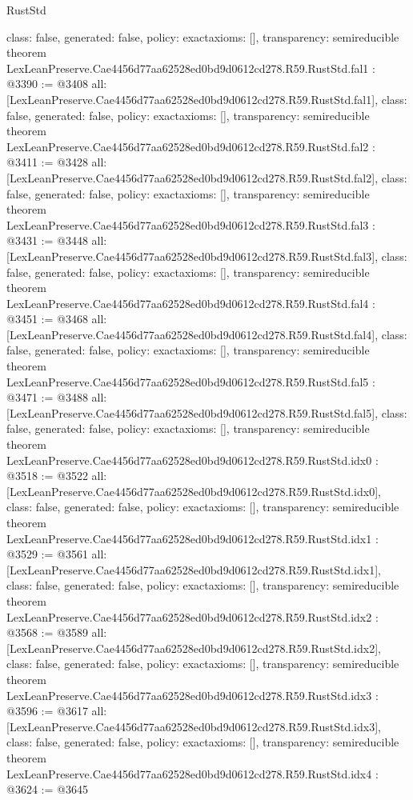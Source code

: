 \begin{lexlean}{RustStd}
\begin{coremodule}
{  class: false,
  generated: false,
  policy: exact{axioms: []},
  transparency: semireducible
}
theorem LexLeanPreserve.Cae4456d77aa62528ed0bd9d0612cd278.R59.RustStd.fal1 : @3390 := @3408 {
  all: [LexLeanPreserve.Cae4456d77aa62528ed0bd9d0612cd278.R59.RustStd.fal1],
  class: false,
  generated: false,
  policy: exact{axioms: []},
  transparency: semireducible
}
theorem LexLeanPreserve.Cae4456d77aa62528ed0bd9d0612cd278.R59.RustStd.fal2 : @3411 := @3428 {
  all: [LexLeanPreserve.Cae4456d77aa62528ed0bd9d0612cd278.R59.RustStd.fal2],
  class: false,
  generated: false,
  policy: exact{axioms: []},
  transparency: semireducible
}
theorem LexLeanPreserve.Cae4456d77aa62528ed0bd9d0612cd278.R59.RustStd.fal3 : @3431 := @3448 {
  all: [LexLeanPreserve.Cae4456d77aa62528ed0bd9d0612cd278.R59.RustStd.fal3],
  class: false,
  generated: false,
  policy: exact{axioms: []},
  transparency: semireducible
}
theorem LexLeanPreserve.Cae4456d77aa62528ed0bd9d0612cd278.R59.RustStd.fal4 : @3451 := @3468 {
  all: [LexLeanPreserve.Cae4456d77aa62528ed0bd9d0612cd278.R59.RustStd.fal4],
  class: false,
  generated: false,
  policy: exact{axioms: []},
  transparency: semireducible
}
theorem LexLeanPreserve.Cae4456d77aa62528ed0bd9d0612cd278.R59.RustStd.fal5 : @3471 := @3488 {
  all: [LexLeanPreserve.Cae4456d77aa62528ed0bd9d0612cd278.R59.RustStd.fal5],
  class: false,
  generated: false,
  policy: exact{axioms: []},
  transparency: semireducible
}
theorem LexLeanPreserve.Cae4456d77aa62528ed0bd9d0612cd278.R59.RustStd.idx0 : @3518 := @3522 {
  all: [LexLeanPreserve.Cae4456d77aa62528ed0bd9d0612cd278.R59.RustStd.idx0],
  class: false,
  generated: false,
  policy: exact{axioms: []},
  transparency: semireducible
}
theorem LexLeanPreserve.Cae4456d77aa62528ed0bd9d0612cd278.R59.RustStd.idx1 : @3529 := @3561 {
  all: [LexLeanPreserve.Cae4456d77aa62528ed0bd9d0612cd278.R59.RustStd.idx1],
  class: false,
  generated: false,
  policy: exact{axioms: []},
  transparency: semireducible
}
theorem LexLeanPreserve.Cae4456d77aa62528ed0bd9d0612cd278.R59.RustStd.idx2 : @3568 := @3589 {
  all: [LexLeanPreserve.Cae4456d77aa62528ed0bd9d0612cd278.R59.RustStd.idx2],
  class: false,
  generated: false,
  policy: exact{axioms: []},
  transparency: semireducible
}
theorem LexLeanPreserve.Cae4456d77aa62528ed0bd9d0612cd278.R59.RustStd.idx3 : @3596 := @3617 {
  all: [LexLeanPreserve.Cae4456d77aa62528ed0bd9d0612cd278.R59.RustStd.idx3],
  class: false,
  generated: false,
  policy: exact{axioms: []},
  transparency: semireducible
}
theorem LexLeanPreserve.Cae4456d77aa62528ed0bd9d0612cd278.R59.RustStd.idx4 : @3624 := @3645 {
}
\end{coremodule}
\end{lexlean}
